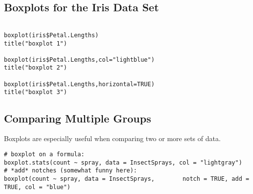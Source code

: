 \documentclass[a4paper,12pt]{article}
\begin{document}

\subsection*{Boxplots for the Iris Data Set}

\begin{framed}
\begin{verbatim}

boxplot(iris$Petal.Lengths)
title("boxplot 1")

boxplot(iris$Petal.Lengths,col="lightblue")
title("boxplot 2")

boxplot(iris$Petal.Lengths,horizontal=TRUE)
title("boxplot 3")

\end{verbatim}
\end{framed}



\subsection*{Comparing Multiple Groups}

Boxplots are especially useful when comparing two or more sets of data. 
\begin{verbatim}
# boxplot on a formula:
boxplot.stats(count ~ spray, data = InsectSprays, col = "lightgray")
# *add* notches (somewhat funny here):
boxplot(count ~ spray, data = InsectSprays,        notch = TRUE, add = TRUE, col = "blue")
\end{verbatim}
\end{document}
